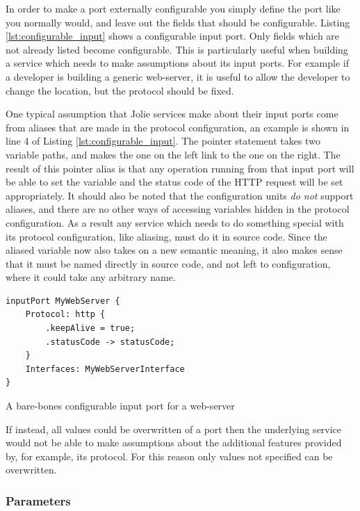 In order to make a port externally configurable you simply define the port like
you normally would, and leave out the fields that should be configurable.
Listing \ref{lst:configurable_input} shows a configurable input port. Only
fields which are not already listed become configurable. This is particularly
useful when building a service which needs to make assumptions about its input
ports. For example if a developer is building a generic web-server, it is
useful to allow the developer to change the location, but the protocol should
be fixed.

One typical assumption that Jolie services make about their input ports come
from aliases that are made in the protocol configuration, an example is shown
in line 4 of Listing \ref{lst:configurable_input}. The pointer statement takes
two variable paths, and makes the one on the left link to the one on the right.
The result of this pointer alias is that any operation running from that input
port will be able to set the variable  and the status code of
the HTTP request will be set appropriately. It should also be noted that the
configuration units \emph{do not} support aliases, and there are no other ways
of accessing variables hidden in the protocol configuration. As a result any
service which needs to do something special with its protocol configuration,
like aliasing, must do it in source code. Since the aliased variable now also
takes on a new semantic meaning, it also makes sense that it must be named
directly in source code, and not left to configuration, where it could take
any arbitrary name.

\begin{listing}[H]
\begin{verbatim}
inputPort MyWebServer {
    Protocol: http {
        .keepAlive = true;
        .statusCode -> statusCode;
    }
    Interfaces: MyWebServerInterface
}
\end{verbatim}
\caption{A bare-bones configurable input port for a web-server}
\label{lst:configurable_input}
\end{listing}

If instead, all values could be overwritten of a port then the underlying
service would not be able to make assumptions about the additional features
provided by, for example, its protocol. For this reason only values not
specified can be overwritten.

\subsubsection*{Parameters}

